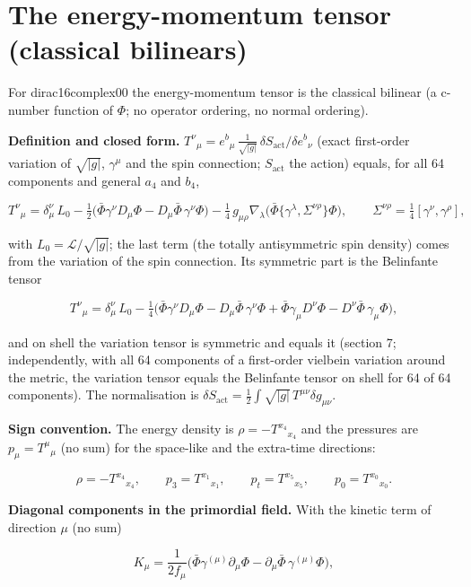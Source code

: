 \documentclass[11pt]{article}
\begin{document}
\section{The energy-momentum tensor (classical bilinears)}

For dirac16complex00 the energy-momentum tensor is the classical bilinear (a c-number function of $\Phi$; no operator ordering, no normal ordering).

\textbf{Definition and closed form.} $T^\nu{}_\mu = e^b{}_\mu\,\tfrac{1}{\sqrt{|g|}}\,\delta S_{\mathrm{act}}/\delta e^b{}_\nu$ (exact first-order variation of $\sqrt{|g|}$, $\gamma^\mu$ and the spin connection; $S_{\mathrm{act}}$ the action) equals, for all 64 components and general $a_4$ and $b_4$,

\[
T^\nu{}_\mu = \delta^\nu_\mu\,L_0 - \tfrac12\big(\bar\Phi\gamma^\nu D_\mu\Phi - D_\mu\bar\Phi\,\gamma^\nu\Phi\big) - \tfrac14\,g_{\mu\rho}\nabla_\lambda\big(\bar\Phi\{\gamma^\lambda, \Sigma^{\nu\rho}\}\Phi\big), \qquad \Sigma^{\nu\rho} = \tfrac14[\gamma^\nu, \gamma^\rho],
\]

with $L_0 = \mathcal{L}/\sqrt{|g|}$; the last term (the totally antisymmetric spin density) comes from the variation of the spin connection. Its symmetric part is the Belinfante tensor

\[
T^\nu{}_\mu = \delta^\nu_\mu\,L_0 - \tfrac14\big(\bar\Phi\gamma^\nu D_\mu\Phi - D_\mu\bar\Phi\,\gamma^\nu\Phi + \bar\Phi\gamma_\mu D^\nu\Phi - D^\nu\bar\Phi\,\gamma_\mu\Phi\big),
\]

and on shell the variation tensor is symmetric and equals it (section 7; independently, with all 64 components of a first-order vielbein variation around the metric, the variation tensor equals the Belinfante tensor on shell for 64 of 64 components). The normalisation is $\delta S_{\mathrm{act}} = \tfrac12\int\sqrt{|g|}\,T^{\mu\nu}\delta g_{\mu\nu}$.

\textbf{Sign convention.} The energy density is $\rho = -T^{x_4}{}_{x_4}$ and the pressures are $p_\mu = T^\mu{}_\mu$ (no sum) for the space-like and the extra-time directions:

\[
\rho = -T^{x_4}{}_{x_4}, \qquad p_3 = T^{x_1}{}_{x_1}, \qquad p_t = T^{x_5}{}_{x_5}, \qquad p_0 = T^{x_0}{}_{x_0} .
\]

\textbf{Diagonal components in the primordial field.} With the kinetic term of direction $\mu$ (no sum)

\[
K_\mu = \frac{1}{2f_\mu}\big(\bar\Phi\gamma^{(\mu)}\partial_\mu\Phi - \partial_\mu\bar\Phi\,\gamma^{(\mu)}\Phi\big),
\]
\end{document}
